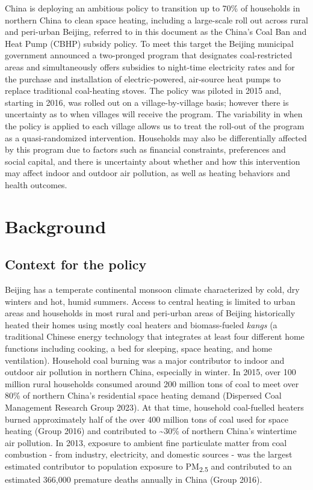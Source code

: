 \documentclass[
  letterpaper,
  DIV=11,
  numbers=noendperiod]{scrartcl}
\begin{document}
China is deploying an ambitious policy to transition up to 70\% of
households in northern China to clean space heating, including a
large-scale roll out across rural and peri-urban Beijing, referred to in
this document as the China's Coal Ban and Heat Pump (CBHP) subsidy
policy. To meet this target the Beijing municipal government announced a
two-pronged program that designates coal-restricted areas and
simultaneously offers subsidies to night-time electricity rates and for
the purchase and installation of electric-powered, air-source heat pumps
to replace traditional coal-heating stoves. The policy was piloted in
2015 and, starting in 2016, was rolled out on a village-by-village
basis; however there is uncertainty as to when villages will receive the
program. The variability in when the policy is applied to each village
allows us to treat the roll-out of the program as a quasi-randomized
intervention. Households may also be differentially affected by this
program due to factors such as financial constraints, preferences and
social capital, and there is uncertainty about whether and how this
intervention may affect indoor and outdoor air pollution, as well as
heating behaviors and health outcomes.

\hypertarget{background}{%
\section{Background}\label{background}}

\hypertarget{context-for-the-policy}{%
\subsection{Context for the policy}\label{context-for-the-policy}}

Beijing has a temperate continental monsoon climate characterized by
cold, dry winters and hot, humid summers. Access to central heating is
limited to urban areas and households in most rural and peri-urban areas
of Beijing historically heated their homes using mostly coal heaters and
biomass-fueled \emph{kangs} (a traditional Chinese energy technology
that integrates at least four different home functions including
cooking, a bed for sleeping, space heating, and home ventilation).
Household coal burning was a major contributor to indoor and outdoor air
pollution in northern China, especially in winter. In 2015, over 100
million rural households consumed around 200 million tons of coal to
meet over 80\% of northern China's residential space heating demand
(Dispersed Coal Management Research Group 2023). At that time, household
coal-fuelled heaters burned approximately half of the over 400 million
tons of coal used for space heating (Group 2016) and contributed to
\textasciitilde30\% of northern China's wintertime air pollution. In
2013, exposure to ambient fine particulate matter from coal combustion -
from industry, electricity, and domestic sources - was the largest
estimated contributor to population exposure to PM\textsubscript{2.5}
and contributed to an estimated 366,000 premature deaths annually in
China (Group 2016).
\end{document}

